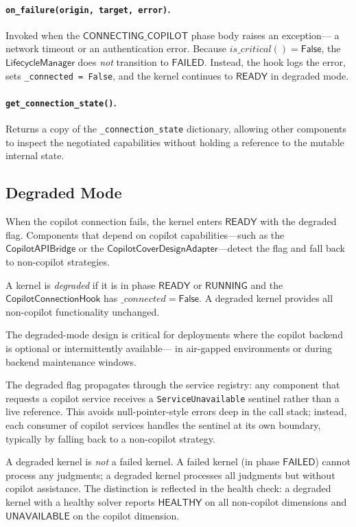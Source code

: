 \documentclass[11pt]{article}
\newcommand{\CCH}{\mathsf{CopilotConnectionHook}}
\newcommand{\CAB}{\mathsf{CopilotAPIBridge}}
\newcommand{\CCD}{\mathsf{CopilotCoverDesignAdapter}}
\newcommand{\LM}{\mathsf{LifecycleManager}}
\newcommand{\CONNECTING}{\mathsf{CONNECTING\_COPILOT}}
\newcommand{\READY}{\mathsf{READY}}
\newcommand{\RUNNING}{\mathsf{RUNNING}}
\newcommand{\FAILED}{\mathsf{FAILED}}
\begin{document}
\paragraph{\texttt{on\_failure(origin, target, error)}.}
Invoked when the $\CONNECTING$ phase body raises an
exception—\eg{} a network timeout or an authentication error.
Because $\mathit{is\_critical}() = \mathsf{False}$, the
$\LM$ does \emph{not} transition to $\FAILED$.
Instead, the hook logs the error, sets
\texttt{\_connected = False}, and the kernel continues to
$\READY$ in degraded mode.

\paragraph{\texttt{get\_connection\_state()}.}
Returns a copy of the \texttt{\_connection\_state} dictionary,
allowing other components to inspect the negotiated capabilities
without holding a reference to the mutable internal state.

\subsection{Degraded Mode}\label{sec:degraded}

When the copilot connection fails, the kernel enters $\READY$
with the degraded flag.  Components that depend on copilot
capabilities—such as the $\CAB$ or the
$\CCD$—detect the flag and fall back to
non-copilot strategies.

\begin{definition}\label{def:degraded}
A kernel is \emph{degraded} if it is in phase $\READY$ or
$\RUNNING$ and the $\CCH$ has
$\mathit{\_connected} = \mathsf{False}$.  A degraded kernel
provides all non-copilot functionality unchanged.
\end{definition}

The degraded-mode design is critical for deployments where the
copilot backend is optional or intermittently available—\eg{} in
air-gapped environments or during backend maintenance windows.

The degraded flag propagates through the service registry: any
component that requests a copilot service receives a
\texttt{ServiceUnavailable} sentinel rather than a live reference.
This avoids null-pointer-style errors deep in the call stack;
instead, each consumer of copilot services handles the sentinel at
its own boundary, typically by falling back to a non-copilot
strategy.

\begin{remark}\label{rem:degraded-failed}
A degraded kernel is \emph{not} a failed kernel.  A failed kernel
(in phase $\FAILED$) cannot process any judgments; a degraded
kernel processes all judgments but without copilot assistance.
The distinction is reflected in the health check: a degraded kernel
with a healthy solver reports $\mathsf{HEALTHY}$ on all
non-copilot dimensions and $\mathsf{UNAVAILABLE}$ on the
copilot dimension.
\end{remark}
\end{document}
